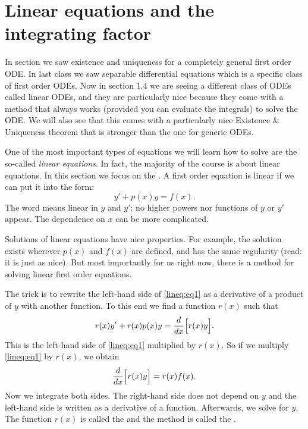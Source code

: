 \sectionnewpage
\section{Linear equations and the integrating factor}
\label{intfactor:section}

\begin{video}
    In section  we saw existence and uniqueness for a completely general first order ODE. In  last class we saw separable differential equations which is a specific class of first order ODEs. Now in section 1.4 we are seeing a different class of ODEs called linear ODEs, and they are particularly nice because they come with a method that always works (provided you can evaluate the integrals) to solve the ODE.  We will also see that this comes with a particularly nice Existence & Uniqueness theorem that is stronger than the one for generic ODEs. 
\end{video}

One of the most important types of equations we will learn how to solve are
the so-called
\emph{linear equations}.
In fact, the majority of the course is about linear
equations.  In this section we focus on the
\emph{}.
A first order equation is linear if we can put it
into the form:
\begin{equation} \label{lineq:eq1}
y' + p(x) y = f(x) .
\end{equation}
The word
 means linear in $y$ and $y'$;
no higher powers nor functions of $y$ or $y'$ appear.
The dependence on $x$ can be more
complicated.

Solutions of linear equations have nice properties.  For example, the
solution exists wherever $p(x)$ and $f(x)$ are defined, and has the same
regularity (read: it is just as nice).  But most importantly for us right now,
there is a method for solving linear first order equations.

The trick is to rewrite the left-hand side
of \eqref{lineq:eq1} as a derivative of a product of $y$ with another
function.
To this end
we find a function $r(x)$ such that
\begin{equation*}
r(x) y' + r(x) p(x) y = \frac{d}{dx}\Bigl[ r(x) y \Bigr] .
\end{equation*}
This is the left-hand side of
\eqref{lineq:eq1} multiplied by $r(x)$.  So if we multiply \eqref{lineq:eq1} by
$r(x)$, we obtain
\begin{equation*}
\frac{d}{dx}\Bigl[ r(x) y \Bigr] = r(x)f(x) .
\end{equation*}
Now we integrate both sides.
The right-hand side does not depend on $y$ and the left-hand side
is written as a derivative of a function.  Afterwards, we solve for $y$.
The function $r(x)$ is called the \emph{} and the
method is called the \emph{}.

